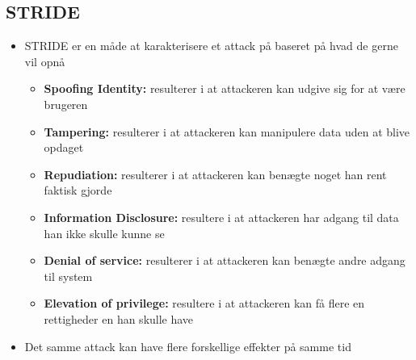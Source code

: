 \documentclass[a4, english]{article}
\begin{document}
\newpage

\subsection{STRIDE} 
\begin{itemize}
	\item STRIDE er en måde at karakterisere et attack på baseret på hvad de gerne vil opnå 
  \begin{itemize}
    \item \textbf{Spoofing Identity:} resulterer i at attackeren kan udgive sig for at være brugeren   
    \item \textbf{Tampering:} resulterer i at attackeren kan manipulere data uden at blive opdaget
    \item \textbf{Repudiation:} resulterer i at attackeren kan benægte noget han rent faktisk gjorde
    \item \textbf{Information Disclosure:} resultere i at attackeren har adgang til data han ikke skulle kunne se   
    \item \textbf{Denial of service:} resulterer i at attackeren kan benægte andre adgang til system
    \item \textbf{Elevation of privilege:} resultere i at attackeren kan få flere en rettigheder en han skulle have
  \end{itemize}
  \item Det samme attack kan have flere forskellige effekter på samme tid 
\end{itemize} 
\end{document}
